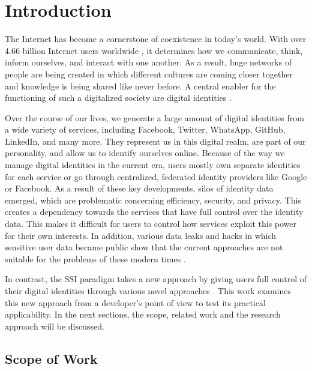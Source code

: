 \chapter{Introduction}\label{chapter: Introduction}
	The Internet has become a cornerstone of coexistence in today's world. With over 4.66 billion Internet users worldwide \cite{johnson_internet_2021}, it determines how we communicate, think, inform ourselves, and interact with one another.	As a result, huge networks of people are being created in which different cultures are coming closer together and knowledge is being shared like never before. A central enabler for the functioning of such a digitalized society are digital identities \cite{liu_blockchain-based_2020}.
	
	Over the course of our lives, we generate a large amount of digital identities from a wide variety of services, including Facebook, Twitter, WhatsApp, GitHub, LinkedIn, and many more. They represent us in this digital realm, are part of our personality, and allow us to identify ourselves online. Because of the way we manage digital identities in the current era, users mostly own separate identities for each service or go through centralized, federated identity providers like Google or Facebook. As a result of these key developments, silos of identity data emerged, which are problematic concerning efficiency, security, and privacy. This creates a dependency towards the services that have full control over the identity data. This makes it difficult for users to control how services exploit this power for their own interests. In addition, various data leaks and hacks in which sensitive user data became public show that the current approaches are not suitable for the problems of these modern times \cite{swinhoe_15_2021}. \cite[pp. 2-3]{ehrlich_self-sovereign_2021}
	
	In contrast, the \ac{SSI} paradigm takes a new approach by giving users full control of their digital identities through various novel approaches \cite[p. 103059]{ferdous_search_2019}. This work examines this new approach from a developer's point of view to test its practical applicability. In the next sections, the scope, related work and the research approach will be discussed.
	
	\section{Scope of Work}\label{section: Scope of Work} %
	

